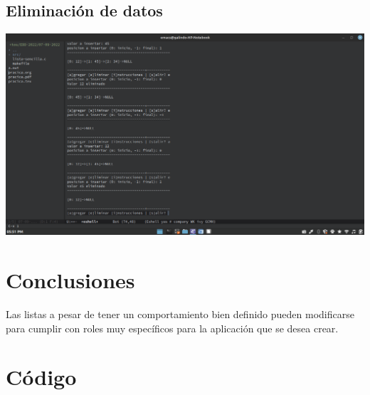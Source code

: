 \documentclass[12pt]{article}
\begin{document}
\subsection*{Eliminación de datos}
\label{sec:orgb4d62ff}
\begin{center}
\includegraphics[width=.9\linewidth]{img/eliminar.png}
\end{center}

\section*{Conclusiones}
\label{sec:orgd3103d0}
Las listas a pesar de tener un comportamiento bien definido pueden modificarse para cumplir con roles muy específicos para la aplicación que se desea crear. 

\section*{Código}
\label{sec:org666220a}

\end{document}
